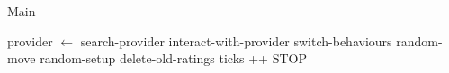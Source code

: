 
\begin{algorithm}[H]
\caption{Main}
\begin{algorithmic} 
\STATE provider $\leftarrow$ search-provider
\STATE interact-with-provider
\ENDIF
\ENDFOR
{}
\STATE switch-behaviours
\ENDFOR
{}
\STATE random-move
\ENDFOR
\STATE random-setup
\STATE delete-old-ratings
\STATE ticks ++
\STATE STOP
\ENDIF
\end{algorithmic}
\end{algorithm}

